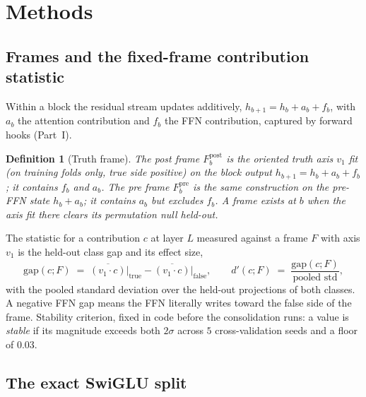 \documentclass[11pt]{article}
\newtheorem{definition}{Definition}
\begin{document}
\section{Methods}
\label{b:sec:methods}

\subsection{Frames and the fixed-frame contribution statistic}
\label{b:sec:fixedaxis}

Within a block the residual stream updates additively,
$h_{b+1} = h_b + a_b + f_b$, with $a_b$ the attention contribution and $f_b$
the FFN contribution, captured by forward hooks (Part~I).

\begin{definition}[Truth frame]
The \emph{post frame} $F_b^{\mathrm{post}}$ is the oriented truth axis $v_1$
fit (on training folds only, true side positive) on the block output
$h_{b+1} = h_b + a_b + f_b$; it contains $f_b$ and $a_b$. The \emph{pre
frame} $F_b^{\mathrm{pre}}$ is the same construction on the pre-FFN state
$h_b + a_b$; it contains $a_b$ but excludes $f_b$. A frame \emph{exists} at
$b$ when the axis fit there clears its permutation null held-out.
\end{definition}

The statistic for a contribution $c$ at layer $L$ measured against a frame
$F$ with axis $v_1$ is the held-out class gap and its effect size,
\begin{equation}
\mathrm{gap}(c; F) \;=\; \overline{(v_1 \cdot c)}\big|_{\mathrm{true}}
- \overline{(v_1 \cdot c)}\big|_{\mathrm{false}},
\qquad
d'(c; F) \;=\; \frac{\mathrm{gap}(c; F)}{\text{pooled std}},
\end{equation}
with the pooled standard deviation over the held-out projections of both
classes. A negative FFN gap means the FFN literally writes toward the false
side of the frame. Stability criterion, fixed in code before the
consolidation runs: a value is \emph{stable} if its magnitude exceeds both
$2\sigma$ across $5$ cross-validation seeds and a floor of $0.03$.

\subsection{The exact SwiGLU split}
\label{b:sec:swiglu}
\end{document}
